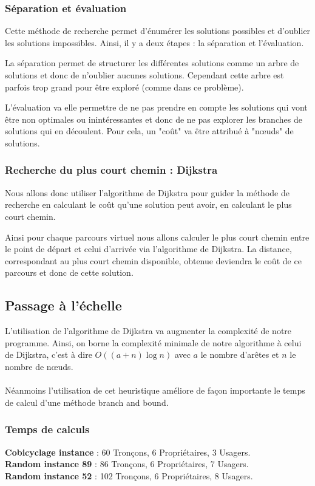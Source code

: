 \documentclass[french]{article}
\begin{document}
\subsubsection{Séparation et évaluation}
Cette méthode de recherche permet d'énumérer les solutions possibles et d'oublier les solutions impossibles. Ainsi, il y a deux étapes : la séparation et l'évaluation.

La séparation permet de structurer les différentes solutions comme un arbre de solutions et donc de n'oublier aucunes solutions. Cependant cette arbre est parfois trop grand pour être exploré (comme dans ce problème).

L'évaluation va elle permettre de ne pas prendre en compte les solutions qui vont être non optimales ou inintéressantes et donc de ne pas explorer les branches de solutions qui en découlent. Pour cela, un "coût" va être attribué à "nœuds" de solutions.

\subsubsection{Recherche du plus court chemin : Dijkstra}
Nous allons donc utiliser l'algorithme de Dijkstra pour guider la méthode de recherche en calculant le coût qu'une solution peut avoir, en calculant le plus court chemin.

Ainsi pour chaque parcours virtuel nous allons calculer le plus court chemin entre le point de départ et celui d'arrivée via l'algorithme de Dijkstra. La distance, correspondant au plus court chemin disponible,  obtenue deviendra le coût de ce parcours et donc de cette solution.

\subsection{Passage à l'échelle}
L'utilisation de l'algorithme de Dijkstra va augmenter la complexité de notre programme. Ainsi, on borne la complexité minimale de notre algorithme à celui de Dijkstra, c'est à dire $O((a+n)\log{}n)$ avec $a$ le nombre d'arêtes et $n$ le nombre de nœuds.\\
\\
Néanmoins l'utilisation de cet heuristique améliore de façon importante le temps de calcul d'une méthode branch and bound.

\subsubsection{Temps de calculs}
\noindent\textbf{Cobicyclage instance} :
60 Tronçons, 6 Propriétaires, 3 Usagers.\\
\textbf{Random instance 89} :
86 Tronçons, 6 Propriétaires, 7 Usagers.\\
\textbf{Random instance 52} :
102 Tronçons, 6 Propriétaires, 8 Usagers.\\\\
\end{document}
